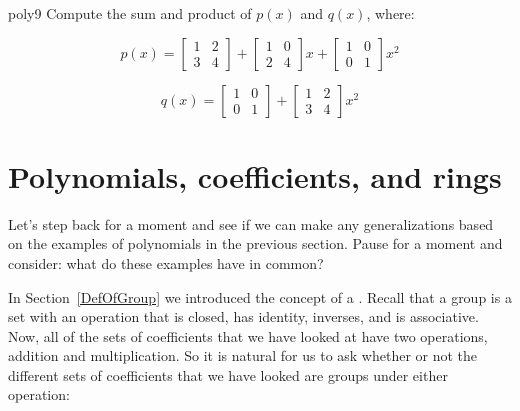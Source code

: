 \begin{exercise}{poly9}
Compute the sum and product of $p(x)$ and $q(x)$, where:

$$p(x)=  \begin{bmatrix} 
1 & 2 \\
3 & 4 
\end{bmatrix}
+\begin{bmatrix} 
1 & 0 \\
2 & 4 
\end{bmatrix}
 x+\begin{bmatrix} 
1 & 0 \\
0 & 1 
\end{bmatrix}
 x^2$$

$$q(x)=  \begin{bmatrix} 
1 & 0 \\
0 & 1 
\end{bmatrix}
+\begin{bmatrix} 
1 & 2 \\
3 & 4 
\end{bmatrix}
 x^2$$
\end{exercise}

\section{Polynomials, coefficients, and  rings}\label{polycoefficients}

Let's step back for a moment and see if we can make any generalizations based on the examples of polynomials in the previous section. Pause for a moment and consider: what do these examples have in common?

In Section~\ref{DefOfGroup} we introduced the concept of a . Recall that a group is a set with an operation that is closed, has identity, inverses, and is associative. Now, all of the sets of coefficients that we have looked at have two operations, addition and multiplication. So  it is natural for us to ask whether or not the different sets of coefficients that we have looked  are groups under either operation:  

